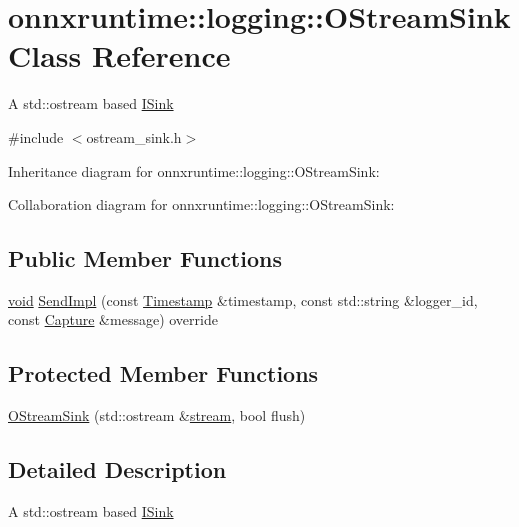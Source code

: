 \hypertarget{classonnxruntime_1_1logging_1_1OStreamSink}{}\section{onnxruntime\+:\+:logging\+:\+:O\+Stream\+Sink Class Reference}
\label{classonnxruntime_1_1logging_1_1OStreamSink}


A std\+::ostream based \mbox{\hyperlink{classonnxruntime_1_1logging_1_1ISink}{I\+Sink}}  




{\ttfamily \#include $<$ostream\+\_\+sink.\+h$>$}



Inheritance diagram for onnxruntime\+:\+:logging\+:\+:O\+Stream\+Sink\+:


Collaboration diagram for onnxruntime\+:\+:logging\+:\+:O\+Stream\+Sink\+:
\subsection*{Public Member Functions}
\begin{DoxyCompactItemize}
\item 
\mbox{\hyperlink{mlasi_8h_a88f941d423cb2a819b70a1358982b1a6}{void}} \mbox{\hyperlink{classonnxruntime_1_1logging_1_1OStreamSink_a456a79a87ca486aa94bc50421a3da1af}{Send\+Impl}} (const \mbox{\hyperlink{namespaceonnxruntime_1_1logging_ae7a2a84f622a028e2ad495a74289012d}{Timestamp}} \&timestamp, const std\+::string \&logger\+\_\+id, const \mbox{\hyperlink{classonnxruntime_1_1logging_1_1Capture}{Capture}} \&message) override
\end{DoxyCompactItemize}
\subsection*{Protected Member Functions}
\begin{DoxyCompactItemize}
\item 
\mbox{\hyperlink{classonnxruntime_1_1logging_1_1OStreamSink_a3c64f6806295288887efd79ccc4ec645}{O\+Stream\+Sink}} (std\+::ostream \&\mbox{\hyperlink{mkldnn_2nn_2pool_8cc_af19a863e7840281d524f99acebb67eda}{stream}}, bool flush)
\end{DoxyCompactItemize}


\subsection{Detailed Description}
A std\+::ostream based \mbox{\hyperlink{classonnxruntime_1_1logging_1_1ISink}{I\+Sink}} 

